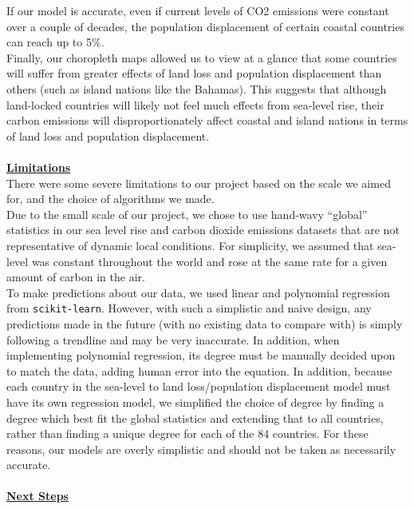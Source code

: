 \documentclass[fontsize=11pt]{article}
\begin{document}
If our model is accurate, even if current levels of CO2 emissions were constant over a couple of decades, the population displacement of certain coastal countries can reach up to 5\%.\\

Finally, our choropleth maps allowed us to view at a glance that some countries will suffer from greater effects of land loss and population displacement than others (such as island nations like the Bahamas). This suggests that although land-locked countries will likely not feel much effects from sea-level rise, their carbon emissions will disproportionately affect coastal and island nations in terms of land loss and population displacement.
\\\\
\textbf{\underline{Limitations}}\\

There were some severe limitations to our project based on the scale we aimed for, and the choice of algorithms we made.\\

Due to the small scale of our project, we chose to use hand-wavy “global” statistics in our sea level rise and carbon dioxide emissions datasets that are not representative of dynamic local conditions. For simplicity, we assumed that sea-level was constant throughout the world and rose at the same rate for a given amount of carbon in the air.\\

To make predictions about our data, we used linear and polynomial regression from \texttt{scikit-learn}. However, with such a simplistic and naive design, any predictions made in the future (with no existing data to compare with) is simply following a trendline and may be very inaccurate. In addition, when implementing polynomial regression, its degree must be manually decided upon to match the data, adding human error into the equation. In addition, because each country in the sea-level to land loss/population displacement model must have its own regression model, we simplified the choice of degree by finding a degree which best fit the global statistics and extending that to all countries, rather than finding a unique degree for each of the 84 countries. For these reasons, our models are overly simplistic and should not be taken as necessarily accurate.\\\\
\textbf{\underline{Next Steps}}\\
\end{document}
